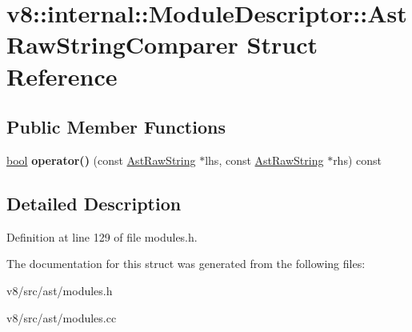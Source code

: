 \hypertarget{structv8_1_1internal_1_1ModuleDescriptor_1_1AstRawStringComparer}{}\section{v8\+:\+:internal\+:\+:Module\+Descriptor\+:\+:Ast\+Raw\+String\+Comparer Struct Reference}
\label{structv8_1_1internal_1_1ModuleDescriptor_1_1AstRawStringComparer}
\subsection*{Public Member Functions}
\begin{DoxyCompactItemize}
\item 
\mbox{\label{structv8_1_1internal_1_1ModuleDescriptor_1_1AstRawStringComparer_a57556e65fdace16fa646841db07a50be}} 
\mbox{\hyperlink{classbool}{bool}} {\bfseries operator()} (const \mbox{\hyperlink{classv8_1_1internal_1_1AstRawString}{Ast\+Raw\+String}} $\ast$lhs, const \mbox{\hyperlink{classv8_1_1internal_1_1AstRawString}{Ast\+Raw\+String}} $\ast$rhs) const
\end{DoxyCompactItemize}


\subsection{Detailed Description}


Definition at line 129 of file modules.\+h.



The documentation for this struct was generated from the following files\+:\begin{DoxyCompactItemize}
\item 
v8/src/ast/modules.\+h\item 
v8/src/ast/modules.\+cc\end{DoxyCompactItemize}
